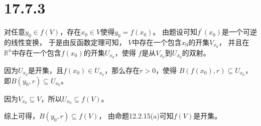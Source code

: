 \documentclass{article}
\begin{document}
\section*{17.7.3}

对任意$y_0 \in f(V)$，存在$x_0 \in V$使得$y_0 = f(x_0)$。
由题设可知$f^\prime(x_0)$是一个可逆的线性变换，
于是由反函数定理可知，
$V$中存在一个包含$x_0$的开集$V_{x_0}$，
并且在$\mathbb{R}^n$中存在一个包含$f(x_0)$的开集$U_{x_0}$，使得
$f$是从$V_{x_0}$到$U_{x_0}$的双射。

因为$U_{x_0}$是开集，且$f(x_0) \in U_{x_0}$，那么存在$r > 0$，使得
$B(f(x_0), r) \subseteq U_{x_0}$，即$B(y_0, r) \subseteq U_{x_0}$。

因为$V_{x_0} \subseteq V$，所以$U_{x_0} \subseteq f(V)$。

综上可得，$B(y_0, r) \subseteq f(V)$，
由命题12.2.15(a)可知$f(V)$是开集。
\end{document}
